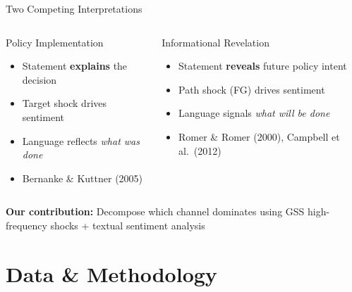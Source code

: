 \documentclass[aspectratio=169, 11pt]{beamer}
\begin{document}
\begin{frame}{Two Competing Interpretations}
\begin{columns}[T]
\begin{fblock}[5.5cm]{Policy Implementation}
\begin{itemize}
  \item Statement \textbf{explains} the decision
  \item Target shock drives sentiment
  \item Language reflects \emph{what was done}
  \item Bernanke \& Kuttner (2005)
\end{itemize}
\end{fblock}

\begin{falertblock}[5.5cm]{Informational Revelation}
\begin{itemize}
  \item Statement \textbf{reveals} future policy intent
  \item Path shock (FG) drives sentiment
  \item Language signals \emph{what will be done}
  \item Romer \& Romer (2000), Campbell et al.\ (2012)
\end{itemize}
\end{falertblock}
\end{columns}

\vspace{0.5em}
\begin{center}
\textbf{Our contribution:} Decompose which channel dominates using GSS high-frequency shocks + textual sentiment analysis
\end{center}
\end{frame}

\section{Data \& Methodology}
\end{document}
